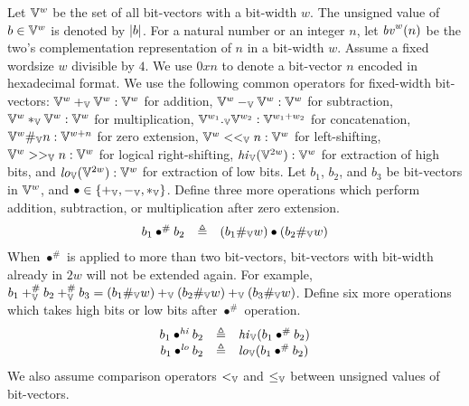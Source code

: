 Let $\mathbb{V}^w$ be the set of all bit-vectors with a bit-width $w$.
The unsigned value of $b \in \mathbb{V}^w$ is denoted by $|b|$.
For a natural number or an integer $n$, let $\mathit{bv}^w(n)$ be the two's complementation representation of $n$ in a bit-width $w$.
Assume a fixed wordsize $w$ divisible by $4$.
We use $0xn$ to denote a bit-vector $n$ encoded in hexadecimal format.
We use the following common operators for fixed-width bit-vectors: $\mathbb{V}^w +_{\mathbb{V}} \mathbb{V}^w : \mathbb{V}^w$ for addition, $\mathbb{V}^w -_{\mathbb{V}} \mathbb{V}^w : \mathbb{V}^w$ for subtraction, $\mathbb{V}^w *_{\mathbb{V}} \mathbb{V}^w : \mathbb{V}^w$ for multiplication, $\mathbb{V}^{w_1} ._{\mathbb{V}} \mathbb{V}^{w_2} : \mathbb{V}^{w_1 + w_2}$ for concatenation, $\mathbb{V}^w \#_{\mathbb{V}} n : \mathbb{V}^{w+n}$ for zero extension, $\mathbb{V}^w <<_{\mathbb{V}} n : \mathbb{V}^w$ for left-shifting, $\mathbb{V}^w >>_{\mathbb{V}} n : \mathbb{V}^w$ for logical right-shifting, $\mathit{hi}_{\mathbb{V}}(\mathbb{V}^{2w}) : \mathbb{V}^w$ for extraction of high bits, and $\mathit{lo}_{\mathbb{V}}(\mathbb{V}^{2w}) : \mathbb{V}^w$ for extraction of low bits.
Let $b_1$, $b_2$, and $b_3$ be bit-vectors in $\mathbb{V}^{w}$, and $\bullet \in \{+_{\mathbb{V}}, -_{\mathbb{V}}, *_{\mathbb{V}}\}$.
Define three more operations which perform addition, subtraction, or multiplication after zero extension.
\[
\begin{array}{rcl}
b_1 \bullet^{\#} b_2 & \triangleq & (b_1 \#_{\mathbb{V}} w) \bullet (b_2 \#_{\mathbb{V}} w) \\
\end{array}
\]
When $\bullet^{\#}$ is applied to more than two bit-vectors, bit-vectors with bit-width already in $2w$ will not be extended again.
For example, $b_1 +_{\mathbb{V}}^{\#} b_2 +_{\mathbb{V}}^{\#} b_3 = (b_1 \#_{\mathbb{V}} w) +_{\mathbb{V}} (b_2 \#_{\mathbb{V}} w) +_{\mathbb{V}} (b_3 \#_{\mathbb{V}} w)$.
Define six more operations which takes high bits or low bits after $\bullet^{\#}$ operation.
\[
\begin{array}{rcl}
b_1 \bullet^{\mathit{hi}} b_2 & \triangleq & \mathit{hi}_{\mathbb{V}}(b_1 \bullet^{\#} b_2) \\
b_1 \bullet^{\mathit{lo}} b_2 & \triangleq & \mathit{lo}_{\mathbb{V}}(b_1 \bullet^{\#} b_2) \\
\end{array}
\]
We also assume comparison operators $<_{\mathbb{V}}$ and $\leq_{\mathbb{V}}$ between unsigned values of bit-vectors.



